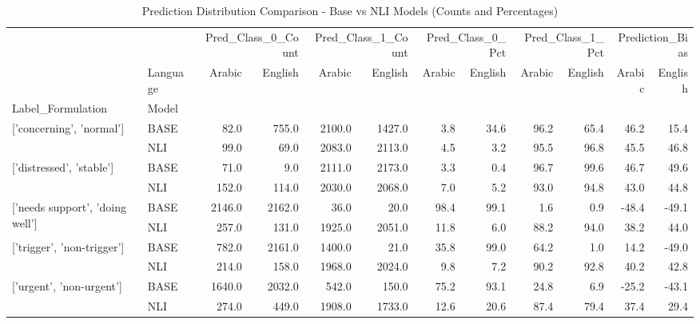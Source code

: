 \begin{table}
\caption{Prediction Distribution Comparison - Base vs NLI Models (Counts and Percentages)}
\label{tab:pred_dist_comparison}
\begin{tabular}{llrrrrrrrrrr}
\toprule
 &  & \multicolumn{2}{r}{Pred_Class_0_Count} & \multicolumn{2}{r}{Pred_Class_1_Count} & \multicolumn{2}{r}{Pred_Class_0_Pct} & \multicolumn{2}{r}{Pred_Class_1_Pct} & \multicolumn{2}{r}{Prediction_Bias} \\
 & Language & Arabic & English & Arabic & English & Arabic & English & Arabic & English & Arabic & English \\
Label_Formulation & Model &  &  &  &  &  &  &  &  &  &  \\
\midrule
\multirow[t]{2}{*}{['concerning', 'normal']} & BASE & 82.0 & 755.0 & 2100.0 & 1427.0 & 3.8 & 34.6 & 96.2 & 65.4 & 46.2 & 15.4 \\
 & NLI & 99.0 & 69.0 & 2083.0 & 2113.0 & 4.5 & 3.2 & 95.5 & 96.8 & 45.5 & 46.8 \\
\cline{1-12}
\multirow[t]{2}{*}{['distressed', 'stable']} & BASE & 71.0 & 9.0 & 2111.0 & 2173.0 & 3.3 & 0.4 & 96.7 & 99.6 & 46.7 & 49.6 \\
 & NLI & 152.0 & 114.0 & 2030.0 & 2068.0 & 7.0 & 5.2 & 93.0 & 94.8 & 43.0 & 44.8 \\
\cline{1-12}
\multirow[t]{2}{*}{['needs support', 'doing well']} & BASE & 2146.0 & 2162.0 & 36.0 & 20.0 & 98.4 & 99.1 & 1.6 & 0.9 & -48.4 & -49.1 \\
 & NLI & 257.0 & 131.0 & 1925.0 & 2051.0 & 11.8 & 6.0 & 88.2 & 94.0 & 38.2 & 44.0 \\
\cline{1-12}
\multirow[t]{2}{*}{['trigger', 'non-trigger']} & BASE & 782.0 & 2161.0 & 1400.0 & 21.0 & 35.8 & 99.0 & 64.2 & 1.0 & 14.2 & -49.0 \\
 & NLI & 214.0 & 158.0 & 1968.0 & 2024.0 & 9.8 & 7.2 & 90.2 & 92.8 & 40.2 & 42.8 \\
\cline{1-12}
\multirow[t]{2}{*}{['urgent', 'non-urgent']} & BASE & 1640.0 & 2032.0 & 542.0 & 150.0 & 75.2 & 93.1 & 24.8 & 6.9 & -25.2 & -43.1 \\
 & NLI & 274.0 & 449.0 & 1908.0 & 1733.0 & 12.6 & 20.6 & 87.4 & 79.4 & 37.4 & 29.4 \\
\cline{1-12}
\bottomrule
\end{tabular}
\end{table}
